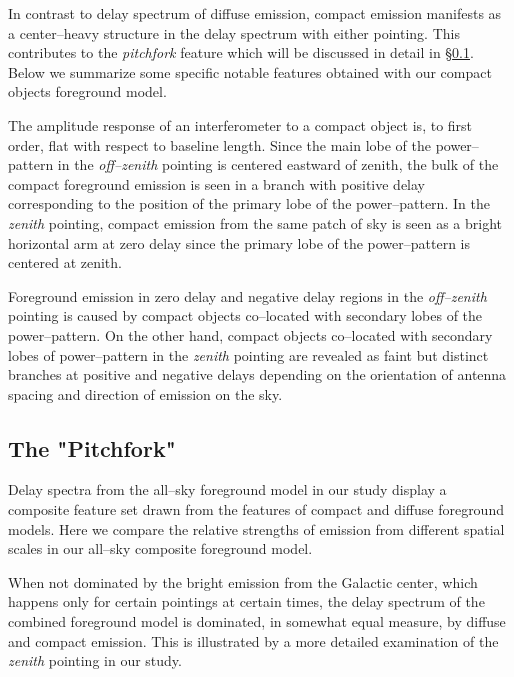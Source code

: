 \documentclass[preprint2,iop,numberedappendix]{emulateapj}
\begin{document}
In contrast to delay spectrum of diffuse emission, compact emission manifests as a center--heavy structure in the delay spectrum with either pointing. This contributes to the {\it pitchfork} feature which will be discussed in detail in \S\ref{sec:composite}. Below we summarize some specific notable features obtained with our compact objects foreground model.


The amplitude response of an interferometer to a compact object is, to first order, flat with respect to baseline length. Since the main lobe of the power--pattern in the {\it off--zenith} pointing is centered eastward of zenith, the bulk of the compact foreground emission is seen in a branch with positive delay corresponding to the position of the primary lobe of the power--pattern. In the {\it zenith} pointing, compact emission from the same patch of sky is seen as a bright horizontal arm at zero delay  since the primary lobe of the power--pattern is centered at zenith. 

Foreground emission in zero delay and negative delay regions in the {\it off--zenith} pointing is caused by compact objects co--located with secondary lobes of the power--pattern. On the other hand, compact objects co--located with secondary lobes of power--pattern in the {\it zenith} pointing are revealed as faint but distinct branches at positive and negative delays depending on the orientation of antenna spacing and direction of emission on the sky. 

\subsection{The "Pitchfork"}\label{sec:composite}

Delay spectra from the all--sky foreground model in our study display a composite feature set drawn from the features of compact and diffuse foreground models. Here we compare the relative strengths of emission from different spatial scales in our all--sky composite foreground model. 

When not dominated by the bright emission from the Galactic center, which happens only for certain pointings at certain times, the delay spectrum of the combined foreground model is dominated, in somewhat equal measure, by diffuse and compact emission. This is illustrated by a more detailed examination of the {\it zenith} pointing in our study. 
\end{document}
